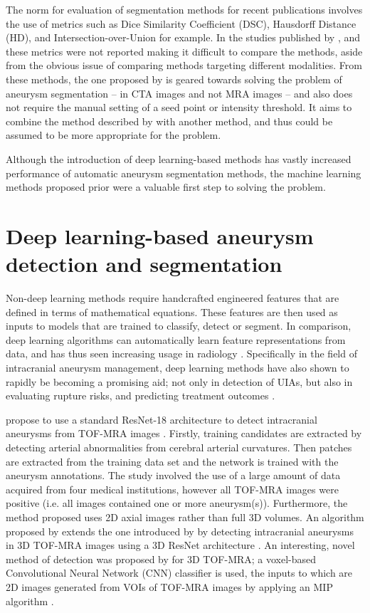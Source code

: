 The norm for evaluation of segmentation methods for recent publications involves the use of metrics such as Dice Similarity Coefficient (DSC), Hausdorff Distance (HD), and Intersection-over-Union for example. In the studies published by \citeauthor{Firouzian2011}, \citeauthor{Bogunovic2011} and \citeauthor{Sen2013} these metrics were not reported making it difficult to compare the methods, aside from the obvious issue of comparing methods targeting different modalities. From these methods, the one proposed by \citeauthor{Sen2013} is geared towards solving the problem of aneurysm segmentation -- in CTA images and not MRA images -- and also does not require the manual setting of a seed point or intensity threshold. It aims to combine the method described by \citeauthor{Firouzian2011} with another method, and thus could be assumed to be more appropriate for the problem. 

Although the introduction of deep learning-based methods has vastly increased performance of automatic aneurysm segmentation methods, the machine learning methods proposed prior were a valuable first step to solving the problem. 

\section{Deep learning-based aneurysm detection and segmentation}
Non-deep learning methods require handcrafted engineered features that are defined in terms of mathematical equations. These features are then used as inputs to models that are trained to classify, detect or segment. In comparison, deep learning algorithms can automatically learn feature representations from data, and has thus seen increasing usage in radiology \cite{Hosny2018}. Specifically in the field of intracranial aneurysm management, deep learning methods have also shown to rapidly be becoming a promising aid; not only in detection of UIAs, but also in evaluating rupture risks, and predicting treatment outcomes \cite{Shi2020}.

\citeauthor{Ueda2019} propose to use a standard ResNet-18 architecture to detect intracranial aneurysms from TOF-MRA images \cite{He2016, Ueda2019}. Firstly, training candidates are extracted by detecting arterial abnormalities from cerebral arterial curvatures. Then patches are extracted from the training data set and the network is trained with the aneurysm annotations. The study involved the use of a large amount of data acquired from four medical institutions, however all TOF-MRA images were positive (i.e. all images contained one or more aneurysm(s)). Furthermore, the method proposed uses 2D axial images rather than full 3D volumes. An algorithm proposed by \citeauthor{Joo2020} extends the one introduced by \citeauthor{Ueda2019} by detecting intracranial aneurysms in 3D TOF-MRA images using a 3D ResNet architecture \cite{He2016, Joo2020}. An interesting, novel method of detection was proposed by \citeauthor{Nakao2018} for 3D TOF-MRA; a voxel-based Convolutional Neural Network (CNN) classifier is used, the inputs to which are 2D images generated from VOIs of TOF-MRA images by applying an MIP algorithm \cite{Nakao2018}. 

